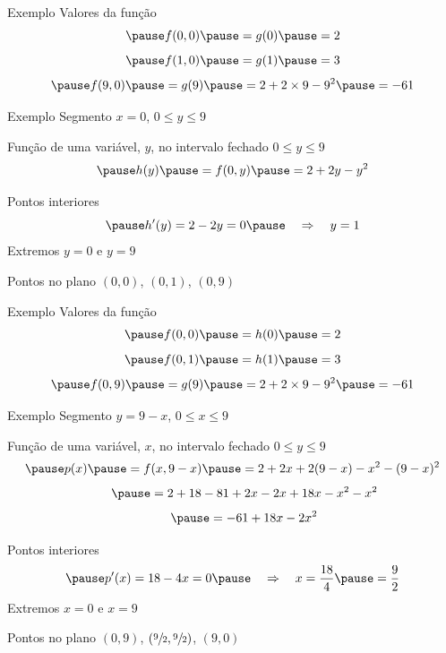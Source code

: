 \begin{frame}{Exemplo \theexemplo}
  Valores da função
  \[
    \pause
    f(0, 0)
    \pause
    = g(0)
    \pause
    = 2
  \]
  \[
    \pause
    f(1, 0)
    \pause
    = g(1)
    \pause
    = 3
  \]
  \[
    \pause
    f(9, 0)
    \pause
    = g(9)
    \pause
    = 2 + 2\times 9 - 9^2
    \pause
    = -61
  \]
\end{frame}

\begin{frame}{Exemplo \theexemplo}
  Segmento \(x=0\), \(0\leq y\leq 9\)

  \pause
  \vspace{\baselineskip}
  Função de uma variável, $y$, no intervalo fechado \(0\leq y\leq 9\)
  \[
    \pause
    h(y)
    \pause
    = f(0, y)
    \pause
    = 2 + 2y - y^2
  \]

  \pause
  \vspace{0.3\baselineskip}
  Pontos interiores
  \[
    \pause
    h'(y) = 2 - 2y = 0
    \pause
    \quad\Rightarrow\quad
    y = 1
  \]
  \pause
  Extremos \(y=0\) e \(y=9\)

  \pause
  \vspace{0.5\baselineskip}
  Pontos no plano
  \((0, 0)\), \((0, 1)\), \((0, 9)\)
\end{frame}

\begin{frame}{Exemplo \theexemplo}
  Valores da função
  \[
    \pause
    f(0, 0)
    \pause
    = h(0)
    \pause
    = 2
  \]
  \[
    \pause
    f(0, 1)
    \pause
    = h(1)
    \pause
    = 3
  \]
  \[
    \pause
    f(0, 9)
    \pause
    = g(9) \pause
    = 2 + 2\times 9 - 9^2
    \pause
    = -61
  \]
\end{frame}

\begin{frame}{Exemplo \theexemplo}
  Segmento \(y=9-x\), \(0\leq x\leq 9\)

  \pause
  \vspace{\baselineskip}
  Função de uma variável, $x$, no intervalo fechado \(0\leq y\leq 9\)
  \[
    \pause
    p(x)
    \pause
    = f(x, 9-x)
    \pause
    = 2 + 2x + 2(9-x) - x^2 - (9-x)^2
  \]
  \[
    \hphantom{p(x)}
    \pause
    = 2 + 18 - 81 + 2x -2x +18x -x^2 - x^2
  \]
  \[
    \hphantom{p(x)}
    \pause
    = -61 + 18x -2x^2
  \]

  \pause
  \vspace{0.3\baselineskip}
  Pontos interiores
  \[
    \pause
    p'(x) = 18 - 4x = 0
    \pause
    \quad\Rightarrow\quad
    x = \frac{18}{4}
    \pause
    = \frac{9}{2}
  \]
  \pause
  Extremos \(x=0\) e \(x=9\)

  \pause
  \vspace{0.5\baselineskip}
  Pontos no plano
  \((0, 9)\), \(\left(\sfrac{9}{2}, \sfrac{9}{2}\right)\), \((9, 0)\)
\end{frame}

